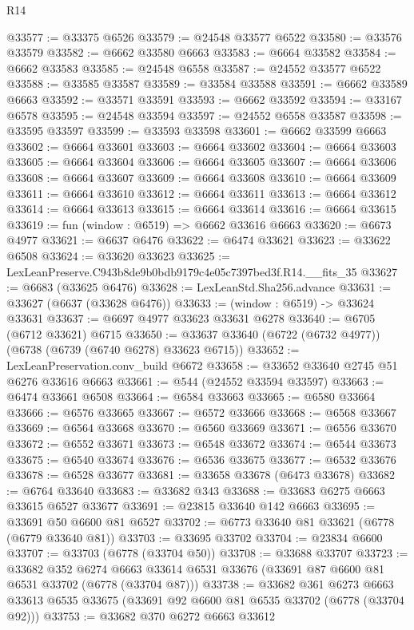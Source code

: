 \begin{lexlean}{R14}
\begin{coremodule}
@33577 := @33375 @6526
@33579 := @24548 @33577 @6522
@33580 := @33576 @33579
@33582 := @6662 @33580 @6663
@33583 := @6664 @33582
@33584 := @6662 @33583
@33585 := @24548 @6558
@33587 := @24552 @33577 @6522
@33588 := @33585 @33587
@33589 := @33584 @33588
@33591 := @6662 @33589 @6663
@33592 := @33571 @33591
@33593 := @6662 @33592
@33594 := @33167 @6578
@33595 := @24548 @33594
@33597 := @24552 @6558 @33587
@33598 := @33595 @33597
@33599 := @33593 @33598
@33601 := @6662 @33599 @6663
@33602 := @6664 @33601
@33603 := @6664 @33602
@33604 := @6664 @33603
@33605 := @6664 @33604
@33606 := @6664 @33605
@33607 := @6664 @33606
@33608 := @6664 @33607
@33609 := @6664 @33608
@33610 := @6664 @33609
@33611 := @6664 @33610
@33612 := @6664 @33611
@33613 := @6664 @33612
@33614 := @6664 @33613
@33615 := @6664 @33614
@33616 := @6664 @33615
@33619 := fun (window : @6519) => @6662 @33616 @6663
@33620 := @6673 @4977
@33621 := @6637 @6476
@33622 := @6474 @33621
@33623 := @33622 @6508
@33624 := @33620 @33623
@33625 := LexLeanPreserve.C943b8de9b0bdb9179c4e05c7397bed3f.R14.__fits_35
@33627 := @6683 (@33625 @6476)
@33628 := LexLeanStd.Sha256.advance
@33631 := @33627 (@6637 (@33628 @6476))
@33633 := (window : @6519) -> @33624 @33631
@33637 := @6697 @4977 @33623 @33631 @6278
@33640 := @6705 (@6712 @33621) @6715
@33650 := @33637 @33640 (@6722 (@6732 @4977)) (@6738 (@6739 (@6740 @6278) @33623 @6715))
@33652 := LexLeanPreservation.conv_build @6672
@33658 := @33652 @33640 @2745 @51 @6276 @33616 @6663
@33661 := @544 (@24552 @33594 @33597)
@33663 := @6474 @33661 @6508
@33664 := @6584 @33663
@33665 := @6580 @33664
@33666 := @6576 @33665
@33667 := @6572 @33666
@33668 := @6568 @33667
@33669 := @6564 @33668
@33670 := @6560 @33669
@33671 := @6556 @33670
@33672 := @6552 @33671
@33673 := @6548 @33672
@33674 := @6544 @33673
@33675 := @6540 @33674
@33676 := @6536 @33675
@33677 := @6532 @33676
@33678 := @6528 @33677
@33681 := @33658 @33678 (@6473 @33678)
@33682 := @6764 @33640
@33683 := @33682 @343
@33688 := @33683 @6275 @6663 @33615 @6527 @33677
@33691 := @23815 @33640 @142 @6663
@33695 := @33691 @50 @6600 @81 @6527
@33702 := @6773 @33640 @81 @33621 (@6778 (@6779 @33640 @81))
@33703 := @33695 @33702
@33704 := @23834 @6600
@33707 := @33703 (@6778 (@33704 @50))
@33708 := @33688 @33707
@33723 := @33682
    @352
    @6274
    @6663
    @33614
    @6531
    @33676
    (@33691 @87 @6600 @81 @6531 @33702 (@6778 (@33704 @87)))
@33738 := @33682
    @361
    @6273
    @6663
    @33613
    @6535
    @33675
    (@33691 @92 @6600 @81 @6535 @33702 (@6778 (@33704 @92)))
@33753 := @33682
    @370
    @6272
    @6663
    @33612

\end{coremodule}
\end{lexlean}
